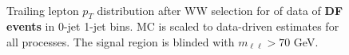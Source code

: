 \begin{figure}[!hbtp]
\centering
{}
\\
\caption{Trailing lepton $p_T$ distribution after WW selection for \intlumiEightTeV of data 
of {\bf DF events} in 0-jet  1-jet  bins. 
MC is scaled to data-driven estimates for all processes. 
The signal region is blinded with $m_{\ell\ell}>70$ GeV. }
\label{fig:ww_ptmin}
\end{figure}

